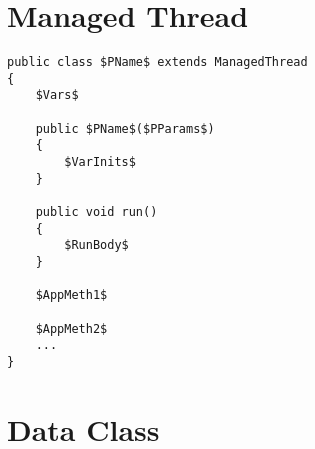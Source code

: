 \documentclass[11pt,a4paper]{article}
\begin{document}
\section*{Managed Thread}

\begin{lstlisting}
public class $PName$ extends ManagedThread
{
	$Vars$
	
	public $PName$($PParams$)
	{
		$VarInits$
	}

	public void run()
	{
		$RunBody$
	}
	
	$AppMeth1$
	
	$AppMeth2$
	...
}
\end{lstlisting}


\section*{Data Class}


\end{document}
